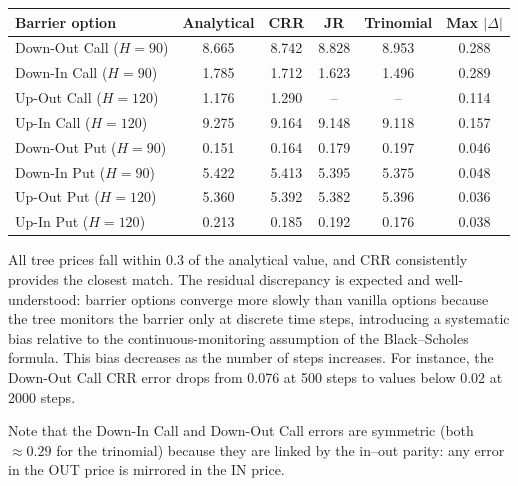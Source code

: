 \documentclass[11pt,a4paper]{article}
\begin{document}
\smallskip
\begin{tabular}{@{}lccccc@{}}
\toprule
Barrier option & Analytical & CRR & JR & Trinomial & Max $|\Delta|$ \\
\midrule
Down-Out Call ($H\!=\!90$) & 8.665 & 8.742 & 8.828 & 8.953 & 0.288 \\
Down-In Call ($H\!=\!90$)  & 1.785 & 1.712 & 1.623 & 1.496 & 0.289 \\
Up-Out Call ($H\!=\!120$)  & 1.176 & 1.290 & -- & -- & 0.114 \\
Up-In Call ($H\!=\!120$)   & 9.275 & 9.164 & 9.148 & 9.118 & 0.157 \\
Down-Out Put ($H\!=\!90$)  & 0.151 & 0.164 & 0.179 & 0.197 & 0.046 \\
Down-In Put ($H\!=\!90$)   & 5.422 & 5.413 & 5.395 & 5.375 & 0.048 \\
Up-Out Put ($H\!=\!120$)   & 5.360 & 5.392 & 5.382 & 5.396 & 0.036 \\
Up-In Put ($H\!=\!120$)    & 0.213 & 0.185 & 0.192 & 0.176 & 0.038 \\
\bottomrule
\end{tabular}
\smallskip

All tree prices fall within 0.3 of the analytical value, and CRR consistently provides the closest match. The residual discrepancy is expected and well-understood: barrier options converge more slowly than vanilla options because the tree monitors the barrier only at discrete time steps, introducing a systematic bias relative to the continuous-monitoring assumption of the Black--Scholes formula. This bias decreases as the number of steps increases.  For instance, the Down-Out Call CRR error drops from 0.076 at 500 steps to values below 0.02 at 2000 steps.

Note that the Down-In Call and Down-Out Call errors are symmetric (both $\approx 0.29$ for the trinomial) because they are linked by the in--out parity: any error in the OUT price is mirrored in the IN price.
\end{document}

